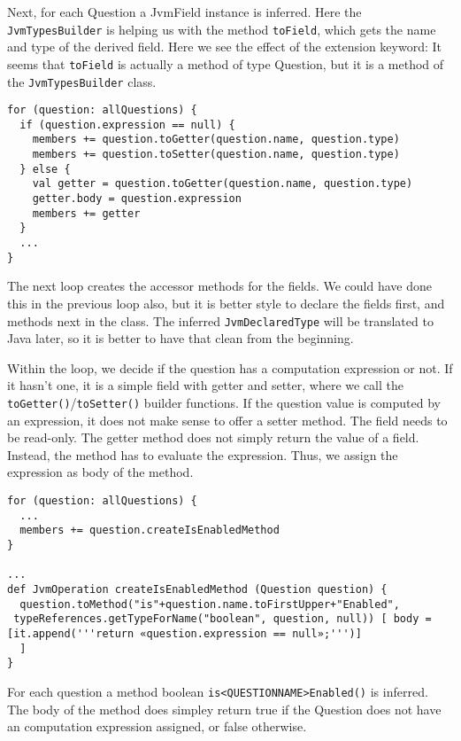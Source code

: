 Next, for each Question a JvmField instance is inferred. Here the
\texttt{JvmTypesBuilder} is helping us with the method \texttt{toField}, which gets the name and
type of the derived field. Here we see the effect of the extension keyword: It
seems that \texttt{toField} is actually a method of type Question, but it is a method of
the \texttt{JvmTypesBuilder} class.

\begin{lstlisting}[language=Xtend]
for (question: allQuestions) {
  if (question.expression == null) {
    members += question.toGetter(question.name, question.type)
    members += question.toSetter(question.name, question.type)
  } else {
    val getter = question.toGetter(question.name, question.type)
    getter.body = question.expression
    members += getter
  }
  ...
}
\end{lstlisting}

The next loop creates the accessor methods for the fields. We could have done
this in the previous loop also, but it is better style to declare the fields
first, and methods next in the class. The inferred \texttt{JvmDeclaredType} will be
translated to Java later, so it is better to have that clean from the beginning.

Within the loop, we decide if the question has a computation expression or not.
If it hasn't one, it is a simple field with getter and setter, where we call the
\texttt{toGetter()}/\texttt{toSetter()} builder functions. If the question value is computed by an
expression, it does not make sense to offer a setter method. The field needs to
be read-only. The getter method does not simply return the value of a field.
Instead, the method has to evaluate the expression. Thus, we assign the
expression as body of the method.

\begin{lstlisting}[language=Xtend]
for (question: allQuestions) {
  ...
  members += question.createIsEnabledMethod
}

...
def JvmOperation createIsEnabledMethod (Question question) {
  question.toMethod("is"+question.name.toFirstUpper+"Enabled",
 typeReferences.getTypeForName("boolean", question, null)) [ body = [it.append('''return «question.expression == null»;''')]
  ]
}
\end{lstlisting}

For each question a method boolean \texttt{is<QUESTIONNAME>Enabled()} is
inferred. The body of the method does simpley return true if the Question does
not have an computation expression assigned, or false otherwise.


